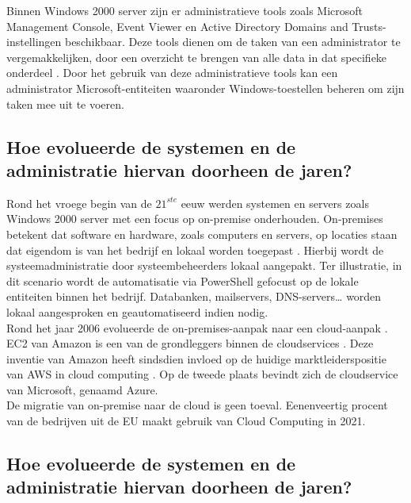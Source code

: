 Binnen Windows 2000 server zijn er administratieve tools zoals Microsoft Management Console, Event Viewer en Active Directory Domains and Trusts-instellingen beschikbaar. Deze tools dienen om de taken van een administrator te vergemakkelijken, door een overzicht te brengen van alle data in dat specifieke onderdeel \autocite{Sibisi2022}. Door het gebruik van deze administratieve tools kan een administrator Microsoft-entiteiten waaronder Windows-toestellen beheren om zijn taken mee uit te voeren. 

\subsection{Hoe evolueerde de systemen en de administratie hiervan doorheen de jaren?}

Rond het vroege begin van de $21^{ste}$ eeuw werden systemen en servers zoals Windows 2000 server met een focus op on-premise onderhouden. On-premises betekent dat software en hardware, zoals computers en servers, op locaties staan dat eigendom is van het bedrijf en lokaal worden toegepast \autocite{Insight2023}. Hierbij wordt de systeemadministratie door systeembeheerders lokaal aangepakt. Ter illustratie, in dit scenario wordt de automatisatie via PowerShell gefocust op de lokale entiteiten binnen het bedrijf. Databanken, mailservers, DNS-servers… worden lokaal aangesproken en geautomatiseerd indien nodig. \\

Rond het jaar 2006 evolueerde de on-premises-aanpak naar een cloud-aanpak \autocite{Hayes2008}. EC2 van Amazon is een van de grondleggers binnen de cloudservices \autocite{Qian2009}. Deze inventie van Amazon heeft sindsdien invloed op de huidige marktleiderspositie van AWS in cloud computing \autocite{Vailshery2022}. Op de tweede plaats bevindt zich de cloudservice van Microsoft, genaamd Azure. \\

De migratie van on-premise naar de cloud is geen toeval. Eenenveertig procent van de bedrijven uit de \ac{EU} maakt gebruik van Cloud Computing in 2021. %

\subsection{Hoe evolueerde de systemen en de administratie hiervan doorheen de jaren?}

